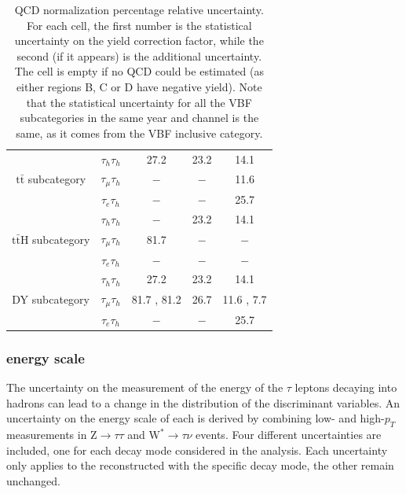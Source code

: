 \documentclass[../main.tex]{subfiles}
\begin{document}
\begin{table}[!h]
\begin{center}
\begin{tabular}{c | c | c | c | c}
                                        & $\tau_h\tau_h$   & 27.2         & 23.2         & 14.1         \\
    $\text{t}\bar{\text{t}}$ subcategory& $\tau_\mu\tau_h$ & $-$          & $-$          & 11.6         \\
                                        & $\tau_e\tau_h$   & $-$          & $-$          & 25.7         \\
    \hline
                                        & $\tau_h\tau_h$   & $-$          & 23.2         & 14.1         \\
    $\text{t}\bar{\text{t}}$H subcategory                    & $\tau_\mu\tau_h$ & 81.7         & $-$          & $-$          \\
                                        & $\tau_e\tau_h$   & $-$          & $-$          & $-$          \\
    \hline
                                        & $\tau_h\tau_h$   & 27.2         & 23.2         & 14.1         \\
    DY subcategory                     & $\tau_\mu\tau_h$ & 81.7 , 81.2  & 26.7         & 11.6 , 7.7   \\
                                        & $\tau_e\tau_h$   & $-$          & $-$          & 25.7         \\
     \hline
    \end{tabular}
  \end{center}
    \caption{QCD normalization percentage relative uncertainty. For each cell, the first number is the statistical uncertainty on the yield correction factor, while the second (if it appears) is the additional uncertainty.
    The cell is empty if no QCD could be estimated (as either regions B, C or D have negative yield). Note that the statistical uncertainty for all the VBF subcategories in the same year and channel is the same, as it comes from the VBF inclusive category.}
	\label{hh:tab:qcd_unc}
\end{table}

\subsubsection*{\tauh{} energy scale}

The uncertainty on the measurement of the energy of the $\tau$ leptons decaying into hadrons can lead to a change in the distribution of the discriminant variables. An uncertainty on the energy scale of each \tauh{} is derived by combining low- and high-$p_T$ measurements in Z$\to\tau\tau$ and $\text{W}^*\to\tau\nu$ events. Four different uncertainties are included, one for each \tauh{} decay mode considered in the analysis. Each uncertainty only applies to the \tauh{} reconstructed with the specific decay mode, the other remain unchanged.
\end{document}
